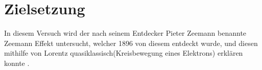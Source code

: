 \setcounter{page}{1}
\section{Zielsetzung}
\label{Zielsetzung}

In diesem Versuch wird der nach seinem Entdecker Pieter Zeemann benannte
Zeemann Effekt untersucht, welcher 1896 von diesem entdeckt wurde,
und diesen mithilfe von Lorentz quasiklassisch(Kreisbewegung eines Elektrons)
erklären konnte \cite{zeemann}.
